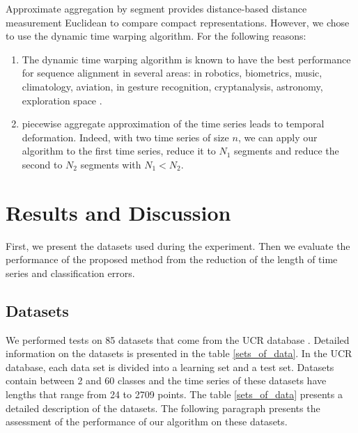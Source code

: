 Approximate aggregation by segment provides distance-based distance measurement
Euclidean to compare compact representations. However, we chose to use the dynamic time warping algorithm. For the following reasons:
\begin{enumerate}
\item The dynamic time warping algorithm  is known to have the best performance for sequence alignment in several areas:
in robotics, biometrics, music, climatology, aviation, in gesture recognition, cryptanalysis, astronomy, exploration
space \cite{Rakthanmanon2012}.
\item piecewise aggregate approximation of the time series leads to temporal deformation. Indeed,
with two time series of size $ n $, we can apply our algorithm to the
 first time series, reduce it to $ N_{1} $ segments and reduce the second to $ N_{2} $
 segments with $ N_{1} <N_{2} $.
\end{enumerate}


\section{Results and Discussion}
\label{results} 
 First, we present the datasets used during the experiment.
 Then we evaluate the performance of the proposed method from the reduction of the
 length of time series and classification errors.

\subsection{Datasets}

We performed tests on 85 datasets that come from the UCR database
\cite{UCRArchive} . Detailed information on the datasets is presented in
the table \ref{sets_of_data}.
 In the UCR database, each data set is divided into a learning set and a test set. Datasets contain between 2 and 60 classes and the time series of these datasets have lengths that range from 24 to 2709 points. The table \ref{sets_of_data} presents a
 detailed description of the datasets. The following paragraph presents the assessment of the performance of our algorithm on these datasets.
 
